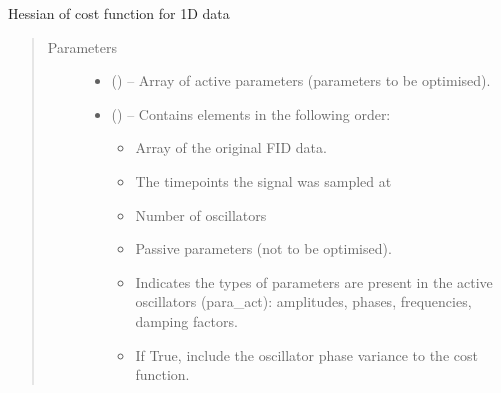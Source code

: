 \documentclass[letterpaper,10pt,english]{sphinxmanual}
\begin{document}
\begin{fulllineitems}
\label{\detokenize{references/nlp/_funcs:nmrespy.nlp._funcs.h_1d}}
\sphinxAtStartPar
Hessian of cost function for 1D data
\begin{quote}\begin{description}
\item[{Parameters}] \leavevmode\begin{itemize}
\item {} 
\sphinxAtStartPar
{} () – Array of active parameters (parameters to be optimised).

\item {} 
\sphinxAtStartPar
{} () – 
\sphinxAtStartPar
Contains elements in the following order:
\begin{itemize}
\item {} 
\sphinxAtStartPar
{}  Array of the original FID data.

\item {} 
\sphinxAtStartPar
{}  The time\sphinxhyphen{}points the signal was sampled at

\item {} 
\sphinxAtStartPar
{}  Number of oscillators

\item {} 
\sphinxAtStartPar
{}  Passive parameters (not to be
optimised).

\item {} 
\sphinxAtStartPar
{}  Indicates the types of parameters are present
in the active oscillators (para\_act):  \sphinxhyphen{} amplitudes,  \sphinxhyphen{}
phases,  \sphinxhyphen{} frequencies,  \sphinxhyphen{} damping factors.

\item {} 
\sphinxAtStartPar
{}  If True, include the oscillator phase
variance to the cost function.


\end{itemize}
\end{itemize}
\end{description}
\end{quote}
\end{fulllineitems}
\end{document}
